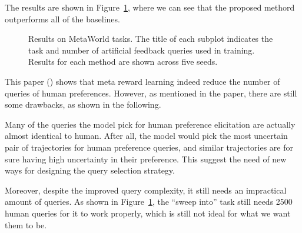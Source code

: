 \documentclass[
  letterpaper,
  numbers=noenddot,
  DIV=11,
  oneside]{scrreprt}
\theoremstyle{remark}
\begin{document}
The results are shown in Figure~\ref{fig-few-exp}, where we can see that
the proposed methord outperforms all of the baselines.

\begin{figure}


\caption{\label{fig-few-exp}Results on MetaWorld tasks. The title of
each subplot indicates the task and number of artificial feedback
queries used in training. Results for each method are shown across five
seeds.}

\end{figure}%

This paper ()
shows that meta reward learning indeed reduce the number of queries of
human preferences. However, as mentioned in the paper, there are still
some drawbacks, as shown in the following.

Many of the queries the model pick for human preference elicitation are
actually almost identical to human. After all, the model would pick the
most uncertain pair of trajectories for human preference queries, and
similar trajectories are for sure having high uncertainty in their
preference. This suggest the need of new ways for designing the query
selection strategy.

Moreover, despite the improved query complexity, it still needs an
impractical amount of queries. As shown in Figure~\ref{fig-few-exp}, the
``sweep into'' task still needs 2500 human queries for it to work
properly, which is still not ideal for what we want them to be.
\end{document}
